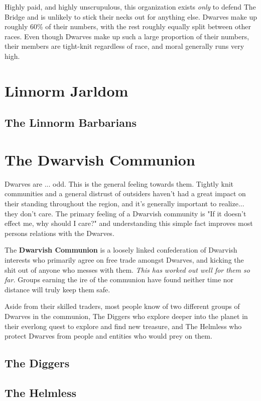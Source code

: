 \documentclass[letterpaper,twocolumn,openany,nodeprecatedcode]{dndbook}
\begin{document}
    Highly paid, and highly unscrupulous, this organization exists \textit{only} to defend The Bridge and is unlikely to stick their necks out for anything else.  Dwarves make up roughly 60\% of their numbers, with the rest roughly equally split between other races.  Even though Dwarves make up such a large proportion of their numbers, their members are tight-knit regardless of race, and moral generally runs very high.


\section{Linnorm Jarldom}
    \subsection{The Linnorm Barbarians}


\section{The Dwarvish Communion}
Dwarves are ... odd.  This is the general feeling towards them.  Tightly knit communities and a general distrust of outsiders haven't had a great impact on their standing throughout the region, and it's generally important to realize... they don't care.  The primary feeling of a Dwarvish community is "If it doesn't effect me, why should I care?" and understanding this simple fact improves most persons relations with the Dwarves.

The \textbf{Dwarvish Communion} is a loosely linked confederation of Dwarvish interests who primarily agree on free trade amongst Dwarves, and kicking the shit out of anyone who messes with them.  \textit{This has worked out well for them so far.}  Groups earning the ire of the communion have found neither time nor distance will truly keep them safe.

Aside from their skilled traders, most people know of two different groups of Dwarves in the communion, The Diggers who explore deeper into the planet in their everlong quest to explore and find new treasure, and The Helmless who protect Dwarves from people and entities who would prey on them.

    \subsection{The Diggers}
    
    \subsection{The Helmless}
\end{document}
